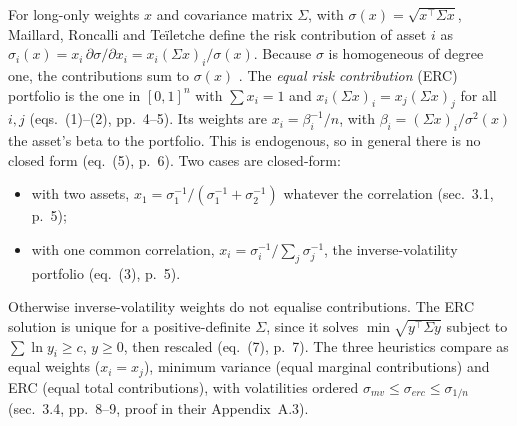 \begin{qfmethod}\label{meth:equal-risk-contribution}
 For long-only weights $x$ and covariance matrix $\Sigma$, with $\sigma(x)=\sqrt{x^\top\Sigma x}$, Maillard, Roncalli and Te\"iletche define the risk contribution of asset $i$ as $\sigma_i(x)=x_i\,\partial\sigma/\partial x_i=x_i(\Sigma x)_i/\sigma(x)$. Because $\sigma$ is homogeneous of degree one, the contributions sum to $\sigma(x)$ \citep[authors' version, May 2009, sec.~2.1, p.~4]{wide-maillard-roncalli-erc}. The \emph{equal risk contribution} (ERC) portfolio is the one in $[0,1]^n$ with $\sum x_i=1$ and $x_i(\Sigma x)_i=x_j(\Sigma x)_j$ for all $i,j$ (eqs.~(1)--(2), pp.~4--5). Its weights are $x_i=\beta_i^{-1}/n$, with $\beta_i=(\Sigma x)_i/\sigma^2(x)$ the asset's beta to the portfolio. This is endogenous, so in general there is no closed form (eq.~(5), p.~6). Two cases are closed-form:
\begin{itemize}
\item with two assets, $x_1=\sigma_1^{-1}/(\sigma_1^{-1}+\sigma_2^{-1})$ whatever the correlation (sec.~3.1, p.~5);
\item with one common correlation, $x_i=\sigma_i^{-1}/\sum_j\sigma_j^{-1}$, the inverse-volatility portfolio (eq.~(3), p.~5).
\end{itemize}
Otherwise inverse-volatility weights do not equalise contributions. The ERC solution is unique for a positive-definite $\Sigma$, since it solves $\min\sqrt{y^\top\Sigma y}$ subject to $\sum\ln y_i\ge c$, $y\ge0$, then rescaled (eq.~(7), p.~7). The three heuristics compare as equal weights ($x_i=x_j$), minimum variance (equal marginal contributions) and ERC (equal total contributions), with volatilities ordered $\sigma_{mv}\le\sigma_{erc}\le\sigma_{1/n}$ (sec.~3.4, pp.~8--9, proof in their Appendix~A.3).


\end{qfmethod}
